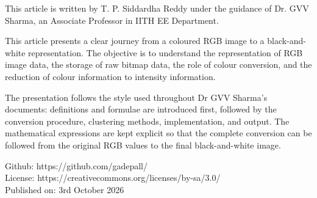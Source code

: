 This article is written by T. P. Siddardha Reddy under the guidance
of Dr. GVV Sharma, an Associate Professor in IITH EE Department.

This article presents a clear journey from a coloured RGB image to a
black-and-white representation. The objective is to understand the
representation of RGB image data, the storage of raw bitmap data, the
role of colour conversion, and the reduction of colour information to
intensity information.

The presentation follows the style used throughout Dr GVV Sharma's documents:
definitions and formulae are introduced first, followed by the
conversion procedure, clustering methods, implementation, and output.
The mathematical expressions are kept explicit so that the complete
conversion can be followed from the original RGB values to the final
black-and-white image.

Github: https://github.com/gadepall/
\\
License: https://creativecommons.org/licenses/by-sa/3.0/
\\
Published on: 3rd October 2026
